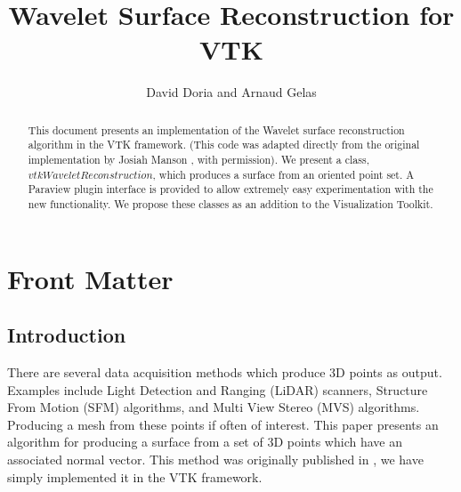 \documentclass{InsightArticle}
\title{Wavelet Surface Reconstruction for VTK}
\author{David Doria and Arnaud Gelas}
\newcommand{\IJhandlerIDnumber}{3149}
\begin{document}
%
% 
\IJhandlefooter{\IJhandlerIDnumber}


\ifpdf
\else
\fi


\maketitle


\ifhtml
\chapter*{Front Matter\label{front}}
\fi


\begin{abstract}
\noindent
This document presents an implementation of the Wavelet surface reconstruction algorithm in the VTK framework. (This code was adapted directly from the original implementation by Josiah Manson \cite{reconstruction}, with permission). We present a class, $vtkWaveletReconstruction$, which produces a surface from an oriented point set. A Paraview plugin interface is provided to allow extremely easy experimentation with the new functionality. We propose these classes as an addition to the Visualization Toolkit.

\end{abstract}

\IJhandlenote{\IJhandlerIDnumber}

\tableofcontents

\section{Introduction}
There are several data acquisition methods which produce 3D points as output. Examples include Light Detection and Ranging (LiDAR) scanners, Structure From Motion (SFM) algorithms, and Multi View Stereo (MVS) algorithms. Producing a mesh from these points if often of interest. This paper presents an algorithm for producing a surface from a set of 3D points which have an associated normal vector. This method was originally published in \cite{reconstruction}, we have simply implemented it in the VTK framework.
\end{document}

